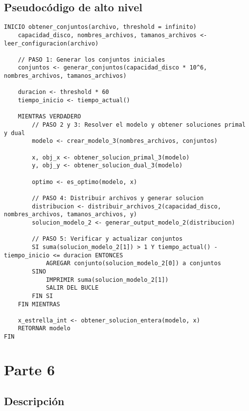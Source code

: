 \documentclass[11pt, a4paper, pdftex]{article}
\begin{document}

\newpage
\subsection{Pseudocódigo de alto nivel}

\begin{lstlisting}
INICIO obtener_conjuntos(archivo, threshold = infinito)
    capacidad_disco, nombres_archivos, tamanos_archivos <- leer_configuracion(archivo)

    // PASO 1: Generar los conjuntos iniciales
    conjuntos <- generar_conjuntos(capacidad_disco * 10^6, nombres_archivos, tamanos_archivos)

    duracion <- threshold * 60
    tiempo_inicio <- tiempo_actual()

    MIENTRAS VERDADERO
        // PASO 2 y 3: Resolver el modelo y obtener soluciones primal y dual
        modelo <- crear_modelo_3(nombres_archivos, conjuntos)

        x, obj_x <- obtener_solucion_primal_3(modelo)
        y, obj_y <- obtener_solucion_dual_3(modelo)

        optimo <- es_optimo(modelo, x)

        // PASO 4: Distribuir archivos y generar solucion
        distribucion <- distribuir_archivos_2(capacidad_disco, nombres_archivos, tamanos_archivos, y)
        solucion_modelo_2 <- generar_output_modelo_2(distribucion)

        // PASO 5: Verificar y actualizar conjuntos
        SI suma(solucion_modelo_2[1]) > 1 Y tiempo_actual() - tiempo_inicio <= duracion ENTONCES
            AGREGAR conjunto(solucion_modelo_2[0]) a conjuntos
        SINO
            IMPRIMIR suma(solucion_modelo_2[1])
            SALIR DEL BUCLE
        FIN SI
    FIN MIENTRAS

    x_estrella_int <- obtener_solucion_entera(modelo, x)
    RETORNAR modelo
FIN
\end{lstlisting}

\newpage
\section{Parte 6}

\subsection{Descripción}
\end{document}
